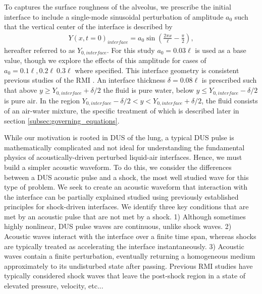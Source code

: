 To captures the surface roughness of the alveolus, we prescribe the
initial interface to include a single-mode sinusoidal perturbation of
amplitude $a_0$ such that the vertical center of the interface is
described by
\begin{align} %
  Y(x,t=0)_{interface} = a_0\sin\left(\frac{2\pi x}{\ell}-\frac{\pi}{2}\right),
\end{align}
hereafter referred to as $Y_{0,interface}$. For this study
$a_0=0.03\ell$ is used as a base value, though we explore the effects
of this amplitude for cases of $a_0=0.1\ell, 0.2\ell\ 0.3\ell$ where
specified. This interface geometry is consistent previous studies of
the \ac{RMI} \citep{Brouillette2002}. An interface thickness
$\delta=0.08\ell$ is prescribed such that above
$y\geq Y_{0,interface}+\delta/2$ the fluid is pure water, below
$y\leq Y_{0,interface}-\delta/2$ is pure air. In the region
$Y_{0,interface}-\delta/2 < y < Y_{0,interface}+\delta/2$, the fluid
consists of an air-water mixture, the specific treatment of which is
described later in section \ref{subsec:governing_equations}.

While our motivation is rooted in \ac{DUS} of the lung, a typical
\ac{DUS} pulse is mathematically complicated and not ideal for
understanding the fundamental physics of acoustically-driven perturbed
liquid-air interfaces. Hence, we must build a simpler acoustic
waveform. To do this, we consider the differences between a \ac{DUS}
acoustic pulse and a shock, the most well studied wave for this type
of problem. We seek to create an acoustic waveform that interaction
with the interface can be partially explained studied using previously
established principles for shock-driven interfaces. We identify three
key conditions that are met by an acoustic pulse that are not met by a
shock. 1) Although sometimes highly nonlinear, \ac{DUS} pulse waves
are continuous, unlike shock waves. 2) Acoustic waves interact with
the interface over a finite time span, whereas shocks are typically
treated as accelerating the interface instantaneously. 3) Acoustic
waves contain a finite perturbation, eventually returning a
homogeneous medium approximately to its undisturbed state after
passing. Previous \ac{RMI} studies have typically considered shock
waves that leave the post-shock region in a state of elevated
pressure, velocity, etc... 

